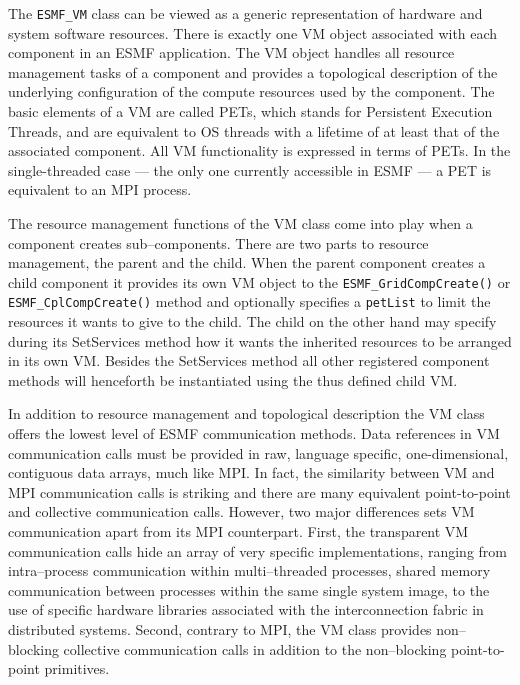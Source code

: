 
The {\tt ESMF\_VM} class can be viewed as a generic representation of hardware and system software resources. There is exactly one VM object associated with each component in an ESMF application. The VM object handles all resource management tasks of a component and provides a topological description of the underlying configuration of the compute resources used by the component. The basic elements of a VM are called PETs, which stands for Persistent Execution Threads, and are equivalent to OS threads with a lifetime of at least that of the associated component. All VM functionality is expressed in terms of PETs. In the single-threaded case --- the only one currently accessible in ESMF --- a PET is equivalent to an MPI process. 

The resource management functions of the VM class come into play when a component creates sub--components. There are two parts to resource management, the parent and the child. When the parent component creates a child component it provides its own VM object to the {\tt ESMF\_GridCompCreate()} or {\tt ESMF\_CplCompCreate()} method and optionally specifies a {\tt petList} to limit the resources it wants to give to the child. The child on the other hand may specify during its SetServices method how it wants the inherited resources to be arranged in its own VM. Besides the SetServices method all other registered component methods will henceforth be instantiated using the thus defined child VM.

In addition to resource management and topological description the VM class offers the lowest level of ESMF communication methods. Data references in VM communication calls must be provided in raw, language specific, one-dimensional, contiguous data arrays, much like MPI. In fact, the similarity between VM and MPI communication calls is striking and there are many equivalent point-to-point and collective communication calls. However, two major differences sets VM communication apart from its MPI counterpart. First, the transparent VM communication calls hide an array of very specific implementations, ranging from intra--process communication within multi--threaded processes, shared memory communication between processes within the same single system image, to the use of specific hardware libraries associated with the interconnection fabric in distributed systems. Second, contrary to MPI, the VM class provides non--blocking collective communication calls in addition to the non--blocking point-to-point primitives.

